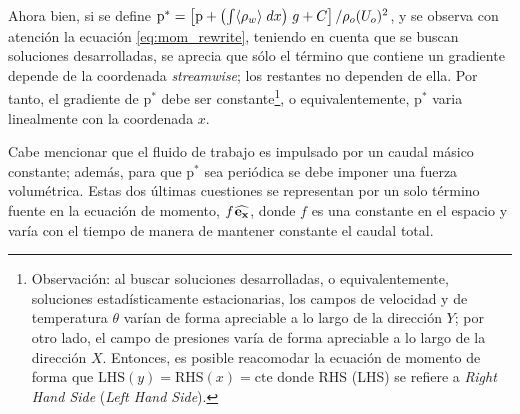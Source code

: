 
Ahora bien, si se define $\text{p}^* = \left[ \text{p} + \left( \int \langle \rho_{w} \rangle \hspace{1mm} dx \right) \hspace{0.5mm} g + C \right] / \rho_o (U_o)^2 $, y se observa con atención la ecuación \ref{eq:mom_rewrite}, teniendo en cuenta que se buscan soluciones desarrolladas, se aprecia que sólo el término que contiene un gradiente depende de la coordenada \textit{streamwise}; los restantes no dependen de ella. Por tanto, el gradiente de $\text{p}^*$ debe ser constante\footnote{Observación: al buscar soluciones desarrolladas, o equivalentemente, soluciones estadísticamente estacionarias, los campos de velocidad y de temperatura $\theta$ varían de forma apreciable a lo largo de la dirección $Y$; por otro lado, el campo de presiones varía de forma apreciable a lo largo de la dirección $X$. Entonces, es posible reacomodar la ecuación de momento de forma que $\text{LHS}(y)=\text{RHS}(x)=\text{cte}$ donde RHS (LHS) se refiere a \textit{Right Hand Side} (\textit{Left Hand Side}).}, o equivalentemente, $\text{p}^*$ varia linealmente con la coordenada $x$. 

Cabe mencionar que el fluido de trabajo es impulsado por un caudal másico constante; además, para que $\text{p}^*$ sea periódica se debe imponer una fuerza volumétrica. Estas dos últimas cuestiones se representan por un solo término fuente en la ecuación de momento, $f \hspace{0.3mm} \mathbf{\widehat{e_x}}$, donde $f$ es una constante en el espacio y varía con el tiempo de manera de mantener constante el caudal total. %

